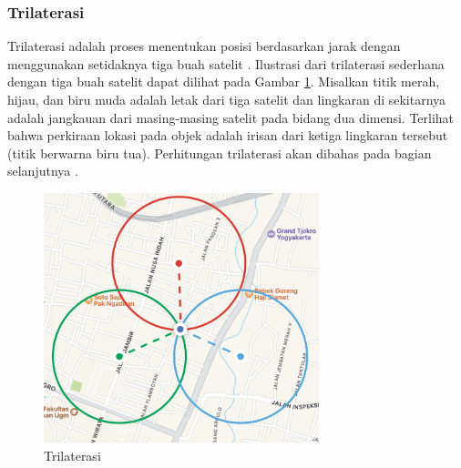 \subsubsection{Trilaterasi}
Trilaterasi adalah proses menentukan posisi berdasarkan jarak dengan menggunakan setidaknya tiga buah satelit \cite{AmericanSocietyofCivilEngineers1994}. Ilustrasi dari trilaterasi sederhana dengan tiga buah satelit dapat dilihat pada Gambar \ref{Fig: Trilaterasi}. Misalkan titik merah, hijau, dan biru muda adalah letak dari tiga satelit dan lingkaran di sekitarnya adalah jangkauan dari masing-masing satelit pada bidang dua dimensi. Terlihat bahwa perkiraan lokasi pada objek adalah irisan dari ketiga lingkaran tersebut (titik berwarna biru tua). Perhitungan trilaterasi akan dibahas pada bagian selanjutnya \cite{Seo2012}.

\begin{figure}[H]
	\centering
	\includegraphics[width=8cm]{contents/chapter-2/trilaterasi.png}
	\caption{Trilaterasi}
	\label{Fig: Trilaterasi}
\end{figure}


